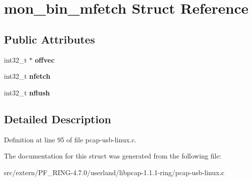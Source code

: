 \hypertarget{structmon__bin__mfetch}{
\section{mon\_\-bin\_\-mfetch Struct Reference}
\label{structmon__bin__mfetch}
}
\subsection*{Public Attributes}
\begin{DoxyCompactItemize}
\item 
\hypertarget{structmon__bin__mfetch_a55ad314f1fbc6559fc006c0d29b18991}{
int32\_\-t $\ast$ {\bfseries offvec}}
\label{structmon__bin__mfetch_a55ad314f1fbc6559fc006c0d29b18991}

\item 
\hypertarget{structmon__bin__mfetch_a3c16d2e29206b45a8b9c0d5280a100e2}{
int32\_\-t {\bfseries nfetch}}
\label{structmon__bin__mfetch_a3c16d2e29206b45a8b9c0d5280a100e2}

\item 
\hypertarget{structmon__bin__mfetch_ae2a2f19454171d73498c20b636e0c96e}{
int32\_\-t {\bfseries nflush}}
\label{structmon__bin__mfetch_ae2a2f19454171d73498c20b636e0c96e}

\end{DoxyCompactItemize}


\subsection{Detailed Description}


Definition at line 95 of file pcap-\/usb-\/linux.c.



The documentation for this struct was generated from the following file:\begin{DoxyCompactItemize}
\item 
src/extern/PF\_\-RING-\/4.7.0/userland/libpcap-\/1.1.1-\/ring/pcap-\/usb-\/linux.c\end{DoxyCompactItemize}
